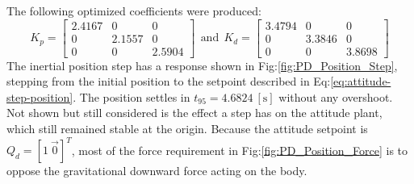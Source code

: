 The following optimized coefficients were produced:
\begin{equation}\label{eq:optimized-position-pd}
K_p = \begin{bmatrix}
2.4167 & 0 & 0\\
0 & 2.1557 & 0\\
0 & 0 & 2.5904
\end{bmatrix}
~~\text{and}~~K_d = \begin{bmatrix}
3.4794 & 0 & 0\\
0 & 3.3846 & 0\\
0 & 0 & 3.8698
\end{bmatrix}
\end{equation}
The inertial position step has a response shown in Fig:\ref{fig:PD_Position_Step}, stepping from the initial position to the setpoint described in Eq:\ref{eq:attitude-step-position}. The position settles in $t_{95}=4.6824~[\text{s}]$ without any overshoot. Not shown but still considered is the effect a step has on the attitude plant, which still remained stable at the origin. Because the attitude setpoint is $Q_d=[1~\vec{0}]^T$, most of the force requirement in Fig:\ref{fig:PD_Position_Force} is to oppose the gravitational downward force acting on the body.
